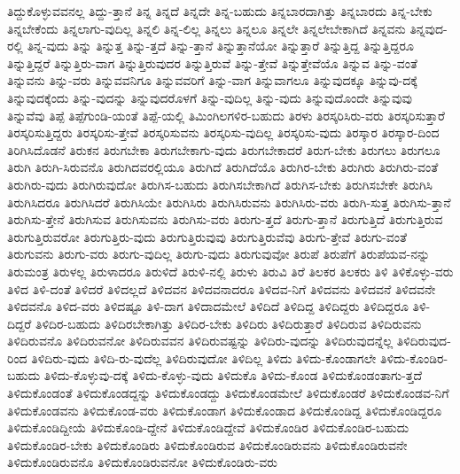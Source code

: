 {ತಿದ್ದುಕೊಳ್ಳುವವನಲ್ಲ
ತಿದ್ದು-ತ್ತಾನೆ
ತಿನ್ನ
ತಿನ್ನದೆ
ತಿನ್ನದೇ
ತಿನ್ನ-ಬಹುದು
ತಿನ್ನಬಾರದಾಗಿತ್ತು
ತಿನ್ನಬಾರದು
ತಿನ್ನ-ಬೇಕು
ತಿನ್ನಬೇಕೆಂದು
ತಿನ್ನಲಾಗು-ವುದಿಲ್ಲ
ತಿನ್ನಲಿ
ತಿನ್ನ-ಲಿಲ್ಲ
ತಿನ್ನಲು
ತಿನ್ನಲೂ
ತಿನ್ನಲೇ
ತಿನ್ನಲೇಬೇಕಾಗಿದೆ
ತಿನ್ನವನು
ತಿನ್ನವುದ-ರಲ್ಲಿ
ತಿನ್ನ-ವುದು
ತಿನ್ನು
ತಿನ್ನುತ್ತ
ತಿನ್ನು-ತ್ತದೆ
ತಿನ್ನು-ತ್ತಾನೆ
ತಿನ್ನುತ್ತಾನೆಯೋ
ತಿನ್ನುತ್ತಾರೆ
ತಿನ್ನುತ್ತಿದ್ದ
ತಿನ್ನುತ್ತಿದ್ದರೂ
ತಿನ್ನುತ್ತಿದ್ದರೆ
ತಿನ್ನುತ್ತಿರು-ವಾಗ
ತಿನ್ನುತ್ತಿರುವುದರ
ತಿನ್ನುತ್ತಿರುವೆ
ತಿನ್ನು-ತ್ತೇವೆ
ತಿನ್ನುತ್ತೇವೆಯೊ
ತಿನ್ನುವ
ತಿನ್ನು-ವಂತೆ
ತಿನ್ನುವನು
ತಿನ್ನು-ವರು
ತಿನ್ನುವವನಿಗೂ
ತಿನ್ನುವವರಿಗೆ
ತಿನ್ನು-ವಾಗ
ತಿನ್ನುವಾಗಲೂ
ತಿನ್ನುವುದಕ್ಕೂ
ತಿನ್ನುವು-ದಕ್ಕೆ
ತಿನ್ನುವುದಕ್ಕೆಂದು
ತಿನ್ನು-ವುದನ್ನು
ತಿನ್ನುವುದರೊಳಗೆ
ತಿನ್ನು-ವುದಿಲ್ಲ
ತಿನ್ನು-ವುದು
ತಿನ್ನುವುದೊಂದೇ
ತಿನ್ನುವುವು
ತಿನ್ನುವೆವು
ತಿಪ್ಪೆ
ತಿಪ್ಪೆಗುಂಡಿ-ಯಂತೆ
ತಿಪ್ಪೆ-ಯಲ್ಲಿ
ತಿಮಿಂಗಿಲಗಳಿರ-ಬಹುದು
ತಿರಳು
ತಿರಸ್ಕರಿಸಿರು-ವರು
ತಿರಸ್ಕರಿಸುತ್ತಾರೆ
ತಿರಸ್ಕರಿಸುತ್ತಿದ್ದರು
ತಿರಸ್ಕರಿಸು-ತ್ತೇವೆ
ತಿರಸ್ಕರಿಸುವನು
ತಿರಸ್ಕರಿಸು-ವುದಿಲ್ಲ
ತಿರಸ್ಕರಿಸು-ವುದು
ತಿರಸ್ಕಾರ
ತಿರಸ್ಕಾರ-ದಿಂದ
ತಿರಿಗಿಸಿದೊಡನೆ
ತಿರುಕನ
ತಿರುಗಬೇಕಾ
ತಿರುಗಬೇಕಾಗು-ವುದು
ತಿರುಗಬೇಕಾದರೆ
ತಿರುಗ-ಬೇಕು
ತಿರುಗಲು
ತಿರುಗಲೂ
ತಿರುಗಿ
ತಿರುಗಿ-ಸಿರುವನೊ
ತಿರುಗಿದವರಲ್ಲಿಯೂ
ತಿರುಗಿದೆ
ತಿರುಗಿದೆಯೊ
ತಿರುಗಿರ-ಬೇಕು
ತಿರುಗಿರು
ತಿರುಗಿರು-ವಂತೆ
ತಿರುಗಿರು-ವುದು
ತಿರುಗಿರುವುದೋ
ತಿರುಗಿಸ-ಬಹುದು
ತಿರುಗಿಸಬೇಕಾಗಿದೆ
ತಿರುಗಿಸ-ಬೇಕು
ತಿರುಗಿಸಬೇಕೇ
ತಿರುಗಿಸಿ
ತಿರುಗಿಸಿದರೂ
ತಿರುಗಿಸಿದರೆ
ತಿರುಗಿಸಿಯೇ
ತಿರುಗಿಸಿರು
ತಿರುಗಿಸಿರುವನು
ತಿರುಗಿಸಿರು-ವರು
ತಿರುಗಿ-ಸುತ್ತ
ತಿರುಗಿಸು-ತ್ತಾನೆ
ತಿರುಗಿಸು-ತ್ತೇನೆ
ತಿರುಗಿಸುವ
ತಿರುಗಿಸುವನು
ತಿರುಗಿಸು-ವರು
ತಿರುಗು-ತ್ತದೆ
ತಿರುಗು-ತ್ತಾನೆ
ತಿರುಗುತ್ತಿದೆ
ತಿರುಗುತ್ತಿರುವ
ತಿರುಗುತ್ತಿರುವರೋ
ತಿರುಗುತ್ತಿರು-ವುದು
ತಿರುಗುತ್ತಿರುವುವು
ತಿರುಗುತ್ತಿರುವೆವು
ತಿರುಗು-ತ್ತೇವೆ
ತಿರುಗು-ವಂತೆ
ತಿರುಗುವನು
ತಿರುಗು-ವರು
ತಿರುಗು-ವುದಿಲ್ಲ
ತಿರುಗು-ವುದು
ತಿರುಗುವುವೋ
ತಿರುಪೆ
ತಿರುಪೆಗೆ
ತಿರುಪೆಯವ-ನನ್ನು
ತಿರುಮಂತ್ರ
ತಿರುಳಲ್ಲ
ತಿರುಳಾದರೂ
ತಿರುಳಿದೆ
ತಿರುಳಿ-ನಲ್ಲಿ
ತಿರುಳು
ತಿರುವಿ
ತಿರೆ
ತಿಲಕರ
ತಿಲಕರು
ತಿಳಿ
ತಿಳಿಕೊಳ್ಳು-ವರು
ತಿಳಿದ
ತಿಳಿ-ದಂತೆ
ತಿಳಿದರೆ
ತಿಳಿದಲ್ಲದೆ
ತಿಳಿದವನ
ತಿಳಿದವನಾದರೂ
ತಿಳಿದವ-ನಿಗೆ
ತಿಳಿದವನು
ತಿಳಿದವನೆ
ತಿಳಿದವನೇ
ತಿಳಿದವನೊ
ತಿಳಿದ-ವರು
ತಿಳಿದಷ್ಟೂ
ತಿಳಿ-ದಾಗ
ತಿಳಿದಾದಮೇಲೆ
ತಿಳಿದಿದೆ
ತಿಳಿದಿದ್ದ
ತಿಳಿದಿದ್ದರು
ತಿಳಿದಿದ್ದರೂ
ತಿಳಿ-ದಿದ್ದರೆ
ತಿಳಿದಿರ-ಬಹುದು
ತಿಳಿದಿರಬೇಕಾಗಿತ್ತು
ತಿಳಿದಿರ-ಬೇಕು
ತಿಳಿದಿರು
ತಿಳಿದಿರುತ್ತಾರೆ
ತಿಳಿದಿರುವ
ತಿಳಿದಿರುವನು
ತಿಳಿದಿರುವನೊ
ತಿಳಿದಿರುವನೋ
ತಿಳಿದಿರುವವನ
ತಿಳಿದಿರುವಷ್ಟನ್ನು
ತಿಳಿದಿರು-ವುದನ್ನು
ತಿಳಿದಿರುವುದನ್ನೆಲ್ಲ
ತಿಳಿದಿರುವುದ-ರಿಂದ
ತಿಳಿದಿರು-ವುದು
ತಿಳಿದಿ-ರು-ವುದೆಲ್ಲ
ತಿಳಿದಿರುವುದೋ
ತಿಳಿದಿಲ್ಲ
ತಿಳಿದು
ತಿಳಿದು-ಕೊಂಡಾಗಲೇ
ತಿಳಿದು-ಕೊಂಡಿರ-ಬಹುದು
ತಿಳಿದು-ಕೊಳ್ಳುವು-ದಕ್ಕೆ
ತಿಳಿದು-ಕೊಳ್ಳು-ವುದು
ತಿಳಿದುಕೊ
ತಿಳಿದು-ಕೊಂಡ
ತಿಳಿದುಕೊಂಡಂತಾಗು-ತ್ತದೆ
ತಿಳಿದುಕೊಂಡಂತೆ
ತಿಳಿದುಕೊಂಡದ್ದನ್ನು
ತಿಳಿದುಕೊಂಡದ್ದು
ತಿಳಿದುಕೊಂಡಮೇಲೆ
ತಿಳಿದುಕೊಂಡರೆ
ತಿಳಿದುಕೊಂಡವ-ನಿಗೆ
ತಿಳಿದುಕೊಂಡವನು
ತಿಳಿದುಕೊಂಡ-ವರು
ತಿಳಿದುಕೊಂಡಾಗ
ತಿಳಿದುಕೊಂಡಾದ
ತಿಳಿದುಕೊಂಡಿದ್ದ
ತಿಳಿದುಕೊಂಡಿದ್ದರೂ
ತಿಳಿದುಕೊಂಡಿದ್ದೀಯೆ
ತಿಳಿದುಕೊಂಡಿ-ದ್ದೇನೆ
ತಿಳಿದುಕೊಂಡಿದ್ದೇವೆ
ತಿಳಿದುಕೊಂಡಿರ
ತಿಳಿದುಕೊಂಡಿರ-ಬಹುದು
ತಿಳಿದುಕೊಂಡಿರ-ಬೇಕು
ತಿಳಿದುಕೊಂಡಿರು
ತಿಳಿದುಕೊಂಡಿರುವ
ತಿಳಿದುಕೊಂಡಿರುವನು
ತಿಳಿದುಕೊಂಡಿರುವನೇ
ತಿಳಿದುಕೊಂಡಿರುವನೊ
ತಿಳಿದುಕೊಂಡಿರುವನೋ
ತಿಳಿದುಕೊಂಡಿರು-ವರು
}
